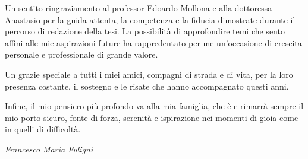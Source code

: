 \documentclass[12pt,a4paper,twoside,openright]{report}
\begin{document}
Un sentito ringraziamento al professor Edoardo Mollona e alla dottoressa Anastasio per la guida attenta, la competenza e la fiducia 
dimostrate durante il percorso di redazione della tesi.
La possibilità di approfondire temi che sento affini alle mie aspirazioni future ha rappredentato per me un’occasione di crescita personale 
e professionale di grande valore.

Un grazie speciale a tutti i miei amici, compagni di strada e di vita, per la loro presenza costante, il sostegno e le risate che 
hanno accompagnato questi anni.

Infine, il mio pensiero più profondo va alla mia famiglia, che è e rimarrà sempre il mio porto sicuro, fonte di forza, serenità e 
ispirazione nei momenti di gioia come in quelli di difficoltà.

\begin{flushright}
  \textit{Francesco Maria Fuligni}
\end{flushright}
\cleardoublepage
\end{document}
